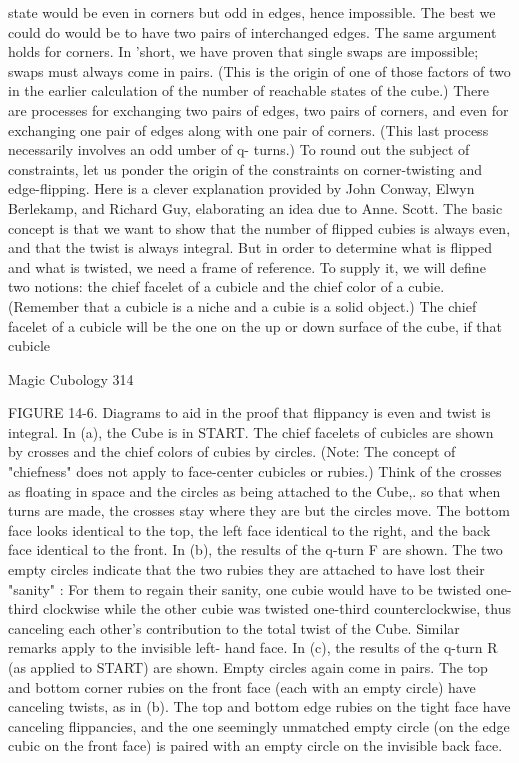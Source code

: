 state would be even in corners but odd in edges, hence impossible. The best we could
do would be to have two pairs of interchanged edges. The same argument holds for
corners. In 'short, we have proven that single swaps are impossible; swaps must
always come in pairs. (This is the origin of one of those factors of two in the earlier
calculation of the number of reachable states of the cube.) There are processes for
exchanging two pairs of edges, two pairs of corners, and even for exchanging one pair
of edges along with one pair of corners. (This last process necessarily involves an odd
umber of q- turns.)
        To round out the subject of constraints, let us ponder the origin of the
constraints on corner-twisting and edge-flipping. Here is a clever explanation
provided by John Conway, Elwyn Berlekamp, and Richard Guy, elaborating an idea
due to Anne. Scott. The basic concept is that we want to show that the number of
flipped cubies is always even, and that the twist is always integral. But in order to
determine what is flipped and what is twisted, we need a frame of reference. To
supply it, we will define two notions: the chief facelet of a cubicle and the chief color
of a cubie. (Remember that a cubicle is a niche and a cubie is a solid object.) The
chief facelet of a cubicle will be the one on the up or down surface of the cube, if that
cubicle




Magic Cubology                                                                        314

FIGURE 14-6. Diagrams to aid in the proof that flippancy is even and twist is
integral.
        In (a), the Cube is in START. The chief facelets of cubicles are shown by
crosses and the chief colors of cubies by circles. (Note: The concept of "chiefness"
does not apply to face-center cubicles or rubies.) Think of the crosses as floating in
space and the circles as being attached to the Cube,. so that when turns are made, the
crosses stay where they are but the circles move. The bottom face looks identical to
the top, the left face identical to the right, and the back face identical to the front.
        In (b), the results of the q-turn F are shown. The two empty circles indicate
that the two rubies they are attached to have lost their "sanity" : For them to regain
their sanity, one cubie would have to be twisted one-third clockwise while the other
cubie was twisted one-third counterclockwise, thus canceling each other's
contribution to the total twist of the Cube. Similar remarks apply to the invisible left-
hand face.
        In (c), the results of the q-turn R (as applied to START) are shown. Empty
circles again come in pairs. The top and bottom corner rubies on the front face (each
with an empty circle) have canceling twists, as in (b). The top and bottom edge rubies
on the tight face have canceling flippancies, and the one seemingly unmatched empty
circle (on the edge cubic on the front face) is paired with an empty circle on the
invisible back face.

